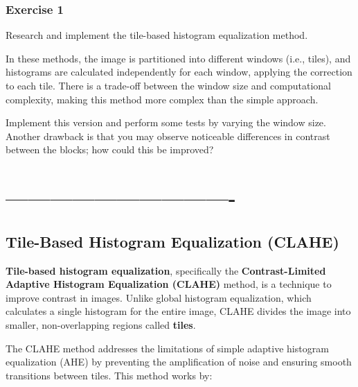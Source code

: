 \documentclass[11pt]{article}
\begin{document}
    \hypertarget{exercise-1}{%
\subsubsection{Exercise 1}\label{exercise-1}}

Research and implement the tile-based histogram equalization method.

In these methods, the image is partitioned into different windows (i.e.,
tiles), and histograms are calculated independently for each window,
applying the correction to each tile. There is a trade-off between the
window size and computational complexity, making this method more
complex than the simple approach.

Implement this version and perform some tests by varying the window
size. Another drawback is that you may observe noticeable differences in
contrast between the blocks; how could this be improved?

\hypertarget{section}{%
\section{-------------------------------}\label{section}}

    \hypertarget{tile-based-histogram-equalization-clahe}{%
\subsection{Tile-Based Histogram Equalization
(CLAHE)}\label{tile-based-histogram-equalization-clahe}}

\textbf{Tile-based histogram equalization}, specifically the
\textbf{Contrast-Limited Adaptive Histogram Equalization (CLAHE)}
method, is a technique to improve contrast in images. Unlike global
histogram equalization, which calculates a single histogram for the
entire image, CLAHE divides the image into smaller, non-overlapping
regions called \textbf{tiles}.

The CLAHE method addresses the limitations of simple adaptive histogram
equalization (AHE) by preventing the amplification of noise and ensuring
smooth transitions between tiles. This method works by:
\end{document}
